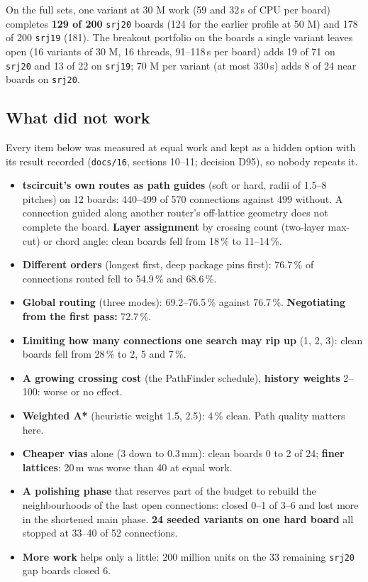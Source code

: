 \documentclass[10pt,a4paper]{article}
\begin{document}
On the full sets, one variant at 30 M work (59 and 32\,s of CPU per board) completes \textbf{129 of 200} \texttt{srj20} boards (124 for the earlier profile at
50 M) and 178 of 200 \texttt{srj19} (181). The breakout portfolio on the boards a single variant leaves open (16 variants of 30 M, 16 threads, 91--118\,s per board)
adds 19 of 71 on \texttt{srj20} and 13 of 22 on \texttt{srj19}; 70 M per variant (at most 330\,s) adds 8 of 24 near boards on \texttt{srj20}.

\subsection{What did not work}

Every item below was measured at equal work and kept as a hidden option with its result recorded
(\texttt{docs/16}, sections 10--11; decision D95), so nobody repeats it.

\begin{itemize}[leftmargin=*]
  \item \textbf{tscircuit's own routes as path guides} (soft or hard, radii of 1.5--8 pitches) on 12 boards: 440--499 of
  570 connections against 499 without. A connection guided along another router's off-lattice geometry does not
  complete the board. \textbf{Layer assignment} by crossing count (two-layer max-cut) or chord angle: clean boards fell from 18\,\% to 11--14\,\%.
  \item \textbf{Different orders} (longest first, deep package pins first): 76.7\,\% of connections routed fell to 54.9\,\% and 68.6\,\%.
  \item \textbf{Global routing} (three modes): 69.2--76.5\,\% against 76.7\,\%. \textbf{Negotiating from the first pass:} 72.7\,\%.
  \item \textbf{Limiting how many connections one search may rip up} (1, 2, 3): clean boards fell from 28\,\% to 2, 5 and 7\,\%.
  \item \textbf{A growing crossing cost} (the PathFinder schedule), \textbf{history weights} 2--100: worse or no effect.
  \item \textbf{Weighted A*} (heuristic weight 1.5, 2.5): 4\,\% clean. Path quality matters here.
  \item \textbf{Cheaper vias} alone (3 down to 0.3\,mm): clean boards 0 to 2 of 24; \textbf{finer lattices}: 20\,\textmu m was worse than 40 at equal work.
  \item \textbf{A polishing phase} that reserves part of the budget to rebuild the neighbourhoods of the last open
  connections: closed 0--1 of 3--6 and lost more in the shortened main phase. \textbf{24 seeded variants on one hard board} all stopped at 33--40 of 52 connections.
  \item \textbf{More work} helps only a little: 200 million units on the 33 remaining \texttt{srj20} gap boards closed 6.
\end{itemize}
\end{document}
